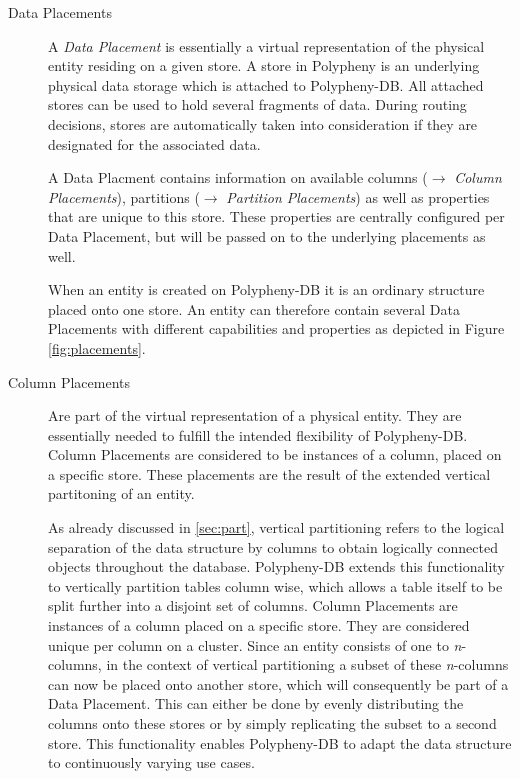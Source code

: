 \begin{description}
    \item [Data Placements] A \emph{Data Placement} is essentially a virtual representation of the physical entity residing on a given store.
    A store in Polypheny is an underlying physical data storage which is attached to Polypheny-DB.
    All attached stores can be used to hold several fragments of data. 
    During routing decisions, stores are automatically taken into consideration if they are designated for the associated data.
    
    A Data Placment contains information on available columns ($\rightarrow$ \emph{Column Placements}), partitions ($\rightarrow$ \emph{Partition Placements})
    as well as properties that are unique to this store. These properties are centrally configured per Data Placement, but will be passed on to the underlying placements as well.
    
    When an entity is created on Polypheny-DB it is an ordinary structure placed onto one store.
    An entity can therefore contain several Data Placements with different capabilities and properties as depicted in Figure \ref{fig:placements}. 
    
    

    \item [Column Placements]
    Are part of the virtual representation of a physical entity. They are essentially needed to fulfill the intended flexibility of Polypheny-DB. 
    Column Placements are considered to be instances of a column, placed on a specific store.
    These placements are the result of the extended vertical partitoning of an entity.


    As already discussed in \ref{sec:part}, vertical partitioning refers to the logical 
    separation of the data structure by columns to obtain logically connected objects throughout 
    the database. Polypheny-DB extends this functionality to vertically partition tables
    column wise, which allows a table itself to be split further into a disjoint 
    set of columns.
    Column Placements are instances of a column placed on a specific store.
    They are considered unique per column on a cluster.
    Since an entity consists of one to \textit{n}-columns,
    in the context of vertical partitioning a subset of these \textit{n}-columns can now 
    be placed onto another store, which will consequently be part of a Data Placement.
    This can either be done by evenly distributing the columns onto these stores 
    or by simply replicating the subset to a second store.
    This functionality enables Polypheny-DB to adapt the data structure to continuously 
    varying use cases.\\


\end{description}
